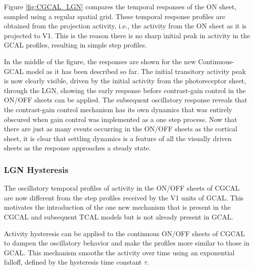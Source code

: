 \documentclass[phd,ianc,twoside]{infthesis}
\begin{document}
Figure \ref{fig:CGCAL_LGN} compares the temporal responses of the ON
sheet, sampled using a regular spatial grid. These temporal response
profiles are obtained from the projection activity, i.e., the
activity from the ON sheet as it is projected to V1. This is the reason
there is no sharp initial peak in activity in the GCAL profiles, resulting
in simple step profiles.

In the middle of the figure, the responses are shown for the new
Continuous-GCAL model as it has been described so far. The initial
transitory activity peak is now clearly visible, driven by the initial
activity from the photoreceptor sheet, through the LGN, showing the
early response before contrast-gain control in the ON/OFF sheets can be
applied. The subsequent oscillatory response reveals that the
contrast-gain control mechanism has its own dynamics that was entirely
obscured when gain control was implemented as a one step process. Now that there
are just as many events occurring in the ON/OFF sheets as the cortical
sheet, it is clear that settling dynamics is a feature of all the
visually driven sheets as the response approaches a steady state.


\subsubsection*{LGN Hysteresis}

The oscillatory temporal profiles of activity in the ON/OFF sheets of
CGCAL are now different from the step profiles received by the V1 units
of GCAL. This motivates the introduction of the one new mechanism that
is present in the CGCAL and subsequent TCAL models but is not already
present in GCAL.

Activity hysteresis can be applied to the continuous ON/OFF sheets of
CGCAL to dampen the oscillatory behavior and make the profiles more
similar to those in GCAL. This mechanism smooths the activity over time
using an exponential falloff, defined by the hysteresis time constant
$\tau$.
\end{document}
